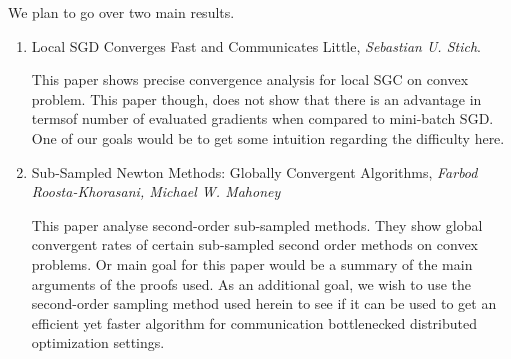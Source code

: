 \documentclass{article}
\begin{document}
\vspace*{-1mm} We plan to go over two main results.
\begin{enumerate}
  \item Local SGD Converges Fast and Communicates Little, \textit{Sebastian U.
    Stich}.

    This paper shows precise convergence analysis for local SGC on convex
    problem. This paper though, does not show that there is an advantage in
    termsof number of evaluated gradients when compared to mini-batch SGD. One
    of our goals would be to get some intuition regarding the difficulty here.

  \item Sub-Sampled Newton Methods: Globally Convergent Algorithms,
    \textit{Farbod Roosta-Khorasani, Michael W. Mahoney}

    This paper analyse second-order sub-sampled methods. They show global
    convergent rates of certain sub-sampled second order methods on convex
    problems. Or main goal for this paper would be a summary of the main
    arguments of the proofs used. As an additional goal, we wish to use the
    second-order sampling method used herein to see if it can be used to get an
    efficient yet faster algorithm for communication bottlenecked distributed
    optimization settings.
\end{enumerate}

%
%
%
%

%
%

%
%
\end{document}
